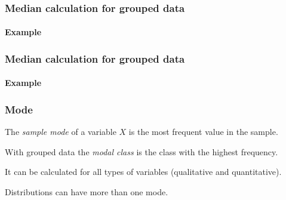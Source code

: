 \begin{frame}
\frametitle{Median calculation for grouped data}
\framesubtitle{Example}

\begin{center}
\resizebox{0.8\textwidth}{!}{}
\end{center}
\end{frame}


\begin{frame}
\frametitle{Median calculation for grouped data}
\framesubtitle{Example}

\centering
{}

 
\end{frame}


\begin{frame}
\frametitle{Mode}
\begin{definition}
The \emph{sample mode} of a variable $X$ is the most frequent value in the sample.
\end{definition}

With grouped data the \emph{modal class} is the class with the highest frequency. 

It can be calculated for all types of variables (qualitative and quantitative). 

Distributions can have more than one mode.
\begin{center}
\scalebox{0.4}{}
\end{center}
\end{frame}


